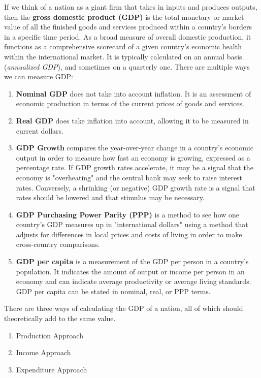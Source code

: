 \documentclass{article}
\begin{document}
  \begin{definition}
    \label{def:gross-domestic-product}
    If we think of a nation as a giant firm that takes in inputs and produces outputs, then the \textbf{gross domestic product (GDP)} is the total monetary or market value of all the finished goods and services produced within a country's borders in a specific time period. As a broad measure of overall domestic production, it functions as a comprehensive scorecard of a given country's economic health within the international market. It is typically calculated on an annual basis (\textit{annualized GDP}), and sometimes on a quarterly one. There are multiple ways we can measure GDP: 
    \begin{enumerate}
      \item \textbf{Nominal GDP} does not take into account inflation. It is an assessment of economic production in terms of the current prices of goods and services.  
      \item \textbf{Real GDP} does take inflation into account, allowing it to be measured in current dollars. 
      \item \textbf{GDP Growth} compares the year-over-year change in a country's economic output in order to measure how fast an economy is growing, expressed as a percentage rate. If GDP growth rates accelerate, it may be a signal that the economy is "overheating" and the central bank may seek to raise interest rates. Conversely, a shrinking (or negative) GDP growth rate is a signal that rates should be lowered and that stimulus may be necessary. 
      \item \textbf{GDP Purchasing Power Parity (PPP)} is a method to see how one country's GDP measures up in "international dollars" using a method that adjusts for differences in local prices and costs of living in order to make cross-country comparisons. 
      \item \textbf{GDP per capita} is a measurement of the GDP per person in a country's population. It indicates the amount of output or income per person in an economy and can indicate average productivity or average living standards. GDP per capita can be stated in nominal, real, or PPP terms. 
    \end{enumerate}
  \end{definition}

  There are three ways of calculating the GDP of a nation, all of which should theoretically add to the same value. 
  \begin{enumerate}
    \item Production Approach
    \item Income Approach
    \item Expenditure Approach
  \end{enumerate}
\end{document}
